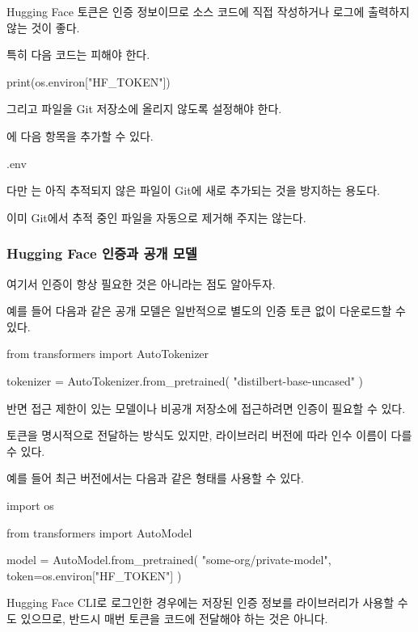 Hugging Face 토큰은 인증 정보이므로 소스 코드에 직접 작성하거나 로그에 출력하지 않는 것이 좋다.

특히 다음 코드는 피해야 한다.

\begin{dhkcode}
print(os.environ["HF_TOKEN"])
\end{dhkcode}

그리고  파일을 Git 저장소에 올리지 않도록 설정해야 한다.

에 다음 항목을 추가할 수 있다.

\begin{dhkzsh}
.env
\end{dhkzsh}

다만 는 아직 추적되지 않은 파일이 Git에 새로 추가되는 것을 방지하는 용도다.

이미 Git에서 추적 중인 파일을 자동으로 제거해 주지는 않는다.

\subsubsection{Hugging Face 인증과 공개 모델}

여기서 인증이 항상 필요한 것은 아니라는 점도 알아두자.

예를 들어 다음과 같은 공개 모델은 일반적으로 별도의 인증 토큰 없이 다운로드할 수 있다.

\begin{dhkcode}
from transformers import AutoTokenizer

tokenizer = AutoTokenizer.from_pretrained(
    "distilbert-base-uncased"
)
\end{dhkcode}

반면 접근 제한이 있는 모델이나 비공개 저장소에 접근하려면 인증이 필요할 수 있다.

토큰을 명시적으로 전달하는 방식도 있지만, 라이브러리 버전에 따라 인수 이름이 다를 수 있다.

예를 들어 최근 버전에서는 다음과 같은 형태를 사용할 수 있다.

\begin{dhkcode}
import os

from transformers import AutoModel

model = AutoModel.from_pretrained(
    "some-org/private-model",
    token=os.environ["HF_TOKEN"]
)
\end{dhkcode}

Hugging Face CLI로 로그인한 경우에는 저장된 인증 정보를 라이브러리가 사용할 수도 있으므로, 반드시 매번 토큰을 코드에 전달해야 하는 것은 아니다.

